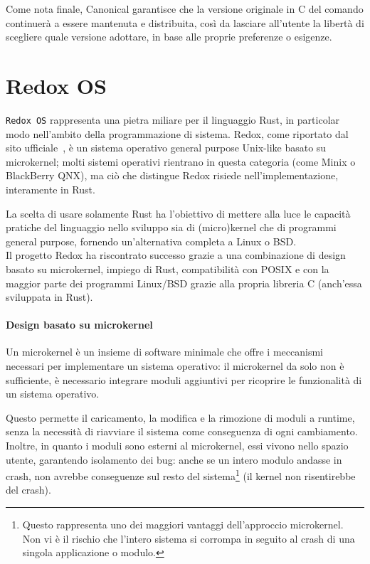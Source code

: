 Come nota finale, Canonical garantisce che la versione originale in C del comando continuerà a essere mantenuta e distribuita,
così da lasciare all'utente la libertà di scegliere quale versione adottare, in base alle proprie preferenze o esigenze.

\section{Redox OS}
\texttt{Redox OS} rappresenta una pietra miliare per il linguaggio Rust, in particolar modo nell'ambito della programmazione di sistema.
Redox, come riportato dal sito ufficiale~\cite{redox-os}, è un sistema operativo general purpose Unix-like basato su microkernel; molti sistemi operativi rientrano in questa categoria (come Minix o BlackBerry QNX),
ma ciò che distingue Redox risiede nell'implementazione, interamente in Rust. 

La scelta di usare solamente Rust ha l'obiettivo di mettere alla luce le capacità pratiche del linguaggio 
nello sviluppo sia di (micro)kernel che di programmi general purpose, fornendo un'alternativa completa a Linux o BSD.\hfill
\vspace{7pt} \\
\noindent Il progetto Redox ha riscontrato successo grazie a una combinazione di design basato su microkernel,
impiego di Rust, compatibilità con POSIX e con la maggior parte dei programmi Linux/BSD grazie alla propria libreria C (anch'essa sviluppata in Rust).

\paragraph{Design basato su microkernel}
Un microkernel è un insieme di software minimale che offre i meccanismi necessari per implementare un sistema operativo: il microkernel da solo
non è sufficiente, è necessario integrare moduli aggiuntivi per ricoprire le funzionalità di un sistema operativo.\ 

Questo permette il caricamento, la modifica e la rimozione di moduli a runtime, senza la necessità di riavviare il sistema come conseguenza di ogni cambiamento.
Inoltre, in quanto i moduli sono esterni al microkernel, essi vivono nello spazio utente, garantendo isolamento dei bug: anche se un intero modulo
andasse in crash, non avrebbe conseguenze sul resto del sistema\footnote{Questo rappresenta uno dei maggiori vantaggi dell'approccio microkernel. Non vi è il rischio che l'intero sistema si corrompa in seguito al crash di una singola applicazione o modulo.} (il kernel non risentirebbe del crash).

